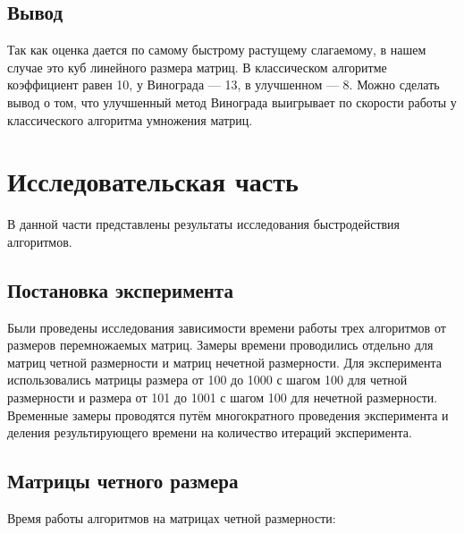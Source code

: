 \documentclass[a4paper, 14pt]{article}
\begin{document}
	\subsection{Вывод}
	Так как оценка дается по самому быстрому растущему слагаемому, в нашем случае это куб линейного размера матриц. В классическом алгоритме коэффициент равен 10, у Винограда — 13, в улучшенном — 8. Можно сделать вывод о том, что улучшенный метод Винограда выигрывает по скорости работы у классического алгоритма умножения матриц.

	\newpage
	\section{Исследовательская часть}
	В данной части представлены результаты  исследования быстродействия алгоритмов.\\

	\subsection{Постановка эксперимента}
	
	Были проведены исследования зависимости времени работы трех алгоритмов от размеров перемножаемых матриц. Замеры времени проводились отдельно для матриц четной размерности и матриц нечетной размерности. Для эксперимента использовались матрицы размера от 100 до 1000 с шагом 100 для четной размерности и размера от 101 до 1001 с шагом 100 для нечетной размерности. Временные замеры проводятся путём многократного проведения эксперимента и деления результирующего времени на количество итераций эксперимента. \\
	
	\subsection{Матрицы четного размера}
	
	Время работы алгоритмов на матрицах четной размерности:
	
\end{document}

